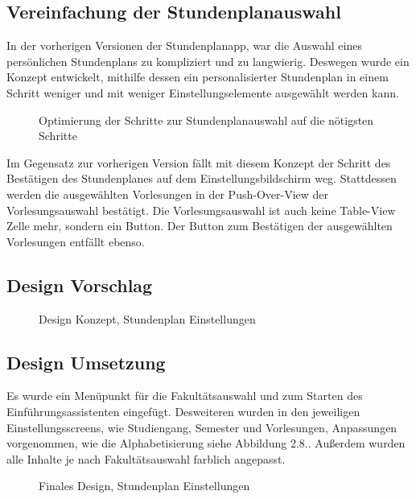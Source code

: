 \subsection{Vereinfachung der Stundenplanauswahl}
In der vorherigen Versionen der Stundenplanapp, war die Auswahl eines persönlichen Stundenplans zu kompliziert und zu langwierig. Deswegen wurde ein Konzept entwickelt, mithilfe dessen ein personalisierter Stundenplan in einem Schritt weniger und mit weniger Einstellungselemente  ausgewählt werden kann.

\begin{figure}[H]
	\centering
	\caption{Optimierung der Schritte zur Stundenplanauswahl auf die nötigsten Schritte}
	\label{fig1}
\end{figure}

Im Gegensatz zur vorherigen Version fällt mit diesem Konzept der Schritt des Bestätigen des Stundenplanes auf dem Einstellungsbildschirm weg. Stattdessen werden die ausgewählten Vorlesungen in der Push-Over-View der Vorlesungsauswahl bestätigt. Die Vorlesungsauswahl ist auch keine Table-View Zelle mehr, sondern ein Button. Der Button zum Bestätigen der ausgewählten Vorlesungen entfällt ebenso.

\subsection{Design Vorschlag}

\begin{figure}[H]
	\centering
	\caption{Design Konzept, Stundenplan Einstellungen}
	\label{fig1}
\end{figure}

\subsection{Design Umsetzung}
Es wurde ein Menüpunkt für die Fakultätsauswahl und zum Starten des Einführungsassistenten eingefügt. Desweiteren wurden in den jeweiligen Einstellungsscreens, wie Studiengang, Semester und Vorlesungen, Anpassungen vorgenommen, wie die Alphabetisierung siehe Abbildung 2.8.. Außerdem wurden alle Inhalte je nach Fakultätsauswahl farblich angepasst.

\begin{figure}[H]
	\centering
	\caption{Finales Design, Stundenplan Einstellungen}
	\label{fig1}
\end{figure}

